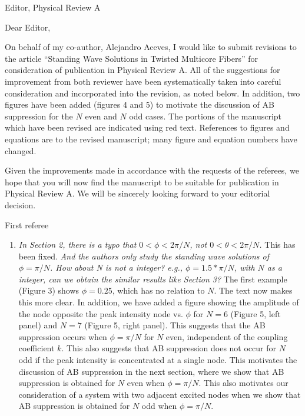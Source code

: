 \documentclass[11pt]{letter}
\begin{document}
\address{Ross Parker \\
Department of Mathematics \\
Southern Methodist University \\
Dallas, TX 75275 \\
\texttt{rhparker@smu.edu}}%
\signature{Ross Parker}
\begin{letter}{Editor, Physical Review A}

\opening{Dear Editor,}

On behalf of my co-author, Alejandro Aceves, I would like to submit revisions to the article ``Standing Wave Solutions in Twisted Multicore Fibers'' for consideration of publication in Physical Review A. All of the suggestions for improvement from both reviewer have been systematically taken into careful consideration and incorporated into the revision, as noted below. In addition, two figures have been added (figures 4 and 5) to motivate the discussion of AB suppression for the $N$ even and $N$ odd cases. The portions of the manuscript which have been revised are indicated using red text. References to figures and equations are to the revised manuscript; many figure and equation numbers have changed.

Given the improvements made in accordance with the requests of the referees, we hope that you will now find the manuscript to be suitable for publication in Physical Review A. We will be sincerely looking forward to your editorial decision.

First referee
\begin{enumerate}
\item \emph{In Section 2, there is a typo that $0<\phi<2\pi/N$, not $0<\theta<2\pi/N$.} This has been fixed. \emph{And the authors only study the standing wave solutions of $\phi=\pi/N$. How about N is not a integer? e.g., $\phi=1.5*\pi/N$, with $N$ as a integer, can we obtain the similar results like Section 3?} The first example (Figure 3) shows $\phi = 0.25$, which has no relation to $N$. The text now makes this more clear. In addition, we have added a figure showing the amplitude of the node opposite the peak intensity node vs. $\phi$ for $N=6$ (Figure 5, left panel) and $N=7$ (Figure 5, right panel). This suggests that the AB suppression occurs when $\phi = \pi/N$ for $N$ even, independent of the coupling coefficient $k$. This also suggests that AB suppression does not occur for $N$ odd if the peak intensity is concentrated at a single node. This motivates the discussion of AB suppression in the next section, where we show that AB suppression is obtained for $N$ even when $\phi = \pi/N$. This also motivates our consideration of a system with two adjacent excited nodes when we show that AB suppression is obtained for $N$ odd when $\phi = \pi/N$.


\end{enumerate}
\end{letter}
\end{document}
